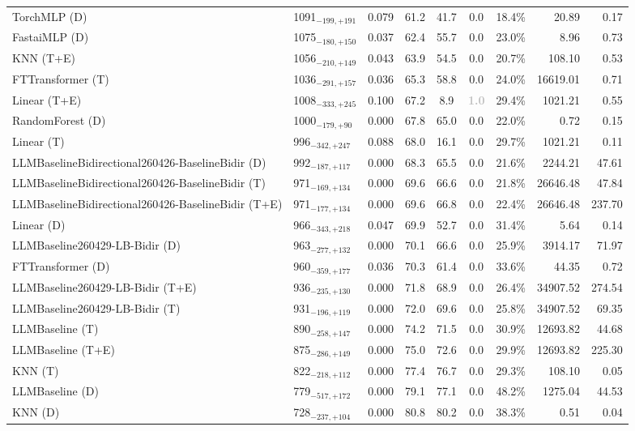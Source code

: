 \begin{tabular}{llcccccrr}
TorchMLP (D) & 1091${}_{-199,+191}$ & 0.079 & 61.2 & 41.7 & 0.0 & 18.4\% & 20.89 & 0.17 \\
FastaiMLP (D) & 1075${}_{-180,+150}$ & 0.037 & 62.4 & 55.7 & 0.0 & 23.0\% & 8.96 & 0.73 \\
KNN (T+E) & 1056${}_{-210,+149}$ & 0.043 & 63.9 & 54.5 & 0.0 & 20.7\% & 108.10 & 0.53 \\
FTTransformer (T) & 1036${}_{-291,+157}$ & 0.036 & 65.3 & 58.8 & 0.0 & 24.0\% & 16619.01 & 0.71 \\
Linear (T+E) & 1008${}_{-333,+245}$ & 0.100 & 67.2 & 8.9 & \textcolor{silver}{\textbf{1.0}} & 29.4\% & 1021.21 & 0.55 \\
RandomForest (D) & 1000${}_{-179,+90}$ & 0.000 & 67.8 & 65.0 & 0.0 & 22.0\% & 0.72 & 0.15 \\
Linear (T) & 996${}_{-342,+247}$ & 0.088 & 68.0 & 16.1 & 0.0 & 29.7\% & 1021.21 & 0.11 \\
LLMBaselineBidirectional260426-BaselineBidir (D) & 992${}_{-187,+117}$ & 0.000 & 68.3 & 65.5 & 0.0 & 21.6\% & 2244.21 & 47.61 \\
LLMBaselineBidirectional260426-BaselineBidir (T) & 971${}_{-169,+134}$ & 0.000 & 69.6 & 66.6 & 0.0 & 21.8\% & 26646.48 & 47.84 \\
LLMBaselineBidirectional260426-BaselineBidir (T+E) & 971${}_{-177,+134}$ & 0.000 & 69.6 & 66.8 & 0.0 & 22.4\% & 26646.48 & 237.70 \\
Linear (D) & 966${}_{-343,+218}$ & 0.047 & 69.9 & 52.7 & 0.0 & 31.4\% & 5.64 & 0.14 \\
LLMBaseline260429-LB-Bidir (D) & 963${}_{-277,+132}$ & 0.000 & 70.1 & 66.6 & 0.0 & 25.9\% & 3914.17 & 71.97 \\
FTTransformer (D) & 960${}_{-359,+177}$ & 0.036 & 70.3 & 61.4 & 0.0 & 33.6\% & 44.35 & 0.72 \\
LLMBaseline260429-LB-Bidir (T+E) & 936${}_{-235,+130}$ & 0.000 & 71.8 & 68.9 & 0.0 & 26.4\% & 34907.52 & 274.54 \\
LLMBaseline260429-LB-Bidir (T) & 931${}_{-196,+119}$ & 0.000 & 72.0 & 69.6 & 0.0 & 25.8\% & 34907.52 & 69.35 \\
LLMBaseline (T) & 890${}_{-258,+147}$ & 0.000 & 74.2 & 71.5 & 0.0 & 30.9\% & 12693.82 & 44.68 \\
LLMBaseline (T+E) & 875${}_{-286,+149}$ & 0.000 & 75.0 & 72.6 & 0.0 & 29.9\% & 12693.82 & 225.30 \\
KNN (T) & 822${}_{-218,+112}$ & 0.000 & 77.4 & 76.7 & 0.0 & 29.3\% & 108.10 & 0.05 \\
LLMBaseline (D) & 779${}_{-517,+172}$ & 0.000 & 79.1 & 77.1 & 0.0 & 48.2\% & 1275.04 & 44.53 \\
KNN (D) & 728${}_{-237,+104}$ & 0.000 & 80.8 & 80.2 & 0.0 & 38.3\% & 0.51 & 0.04 \\
\bottomrule
\end{tabular}